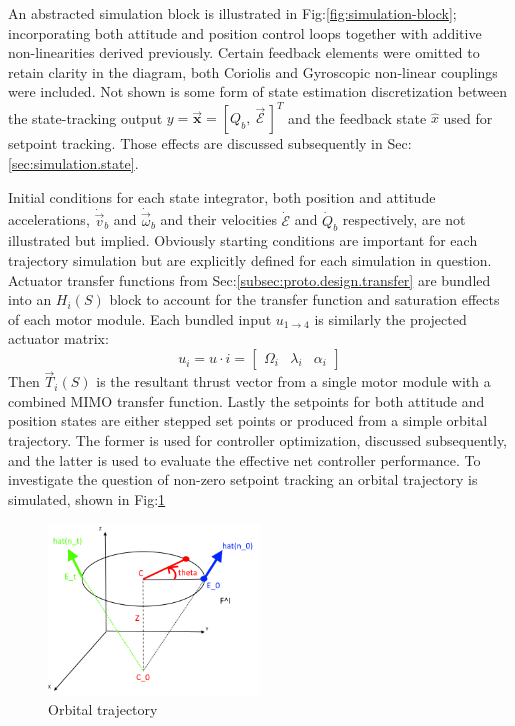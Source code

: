 \vspace{-20pt}
\par
An abstracted simulation block is illustrated in Fig:\ref{fig:simulation-block}; incorporating both attitude and position control loops together with additive non-linearities derived previously. Certain feedback elements were omitted to retain clarity in the diagram, both Coriolis and Gyroscopic non-linear couplings were included. Not shown is some form of state estimation discretization between the state-tracking output $y=\vec{\mathbf{x}}=[Q_b,~\vec{\mathcal{E}}\hspace{2pt}]^T$ and the feedback state $\hat{x}$ used for setpoint tracking. Those effects are discussed subsequently in Sec:\ref{sec:simulation.state}.
\par
Initial conditions for each state integrator, both position and attitude accelerations, $\dot{\vec{v}}_b$ and $\dot{\vec{\omega}}_b$ and their velocities $\dot{\mathcal{E}}$ and $\dot{Q}_b$ respectively, are not illustrated but implied. Obviously starting conditions are important for each trajectory simulation but are explicitly defined for each simulation in question. Actuator transfer functions from Sec:\ref{subsec:proto.design.transfer} are bundled into an $H_{i}(S)$ block to account for the transfer function and saturation effects of each motor module. Each bundled input $u_{1\rightarrow 4}$ is similarly the projected actuator matrix:
\begin{equation}
u_{i}=u\cdot i = \begin{bmatrix}
\Omega_i & \lambda_i & \alpha_i
\end{bmatrix}
\end{equation}
Then $\vec{T}_i(S)$ is the resultant thrust vector from a single motor module with a combined MIMO transfer function. Lastly the setpoints for both attitude and position states are either stepped set points or produced from a simple orbital trajectory. The former is used for controller optimization, discussed subsequently, and the latter is used to evaluate the effective net controller performance. To investigate the question of non-zero setpoint tracking an orbital trajectory is simulated, shown in Fig:\ref{fig:trajectory}
\begin{figure}[htbp]
\centering
\includegraphics[width=0.5\textwidth]{figs/trajectory}
\caption{Orbital trajectory}
\label{fig:trajectory}
\vspace{-18pt}
\end{figure}
